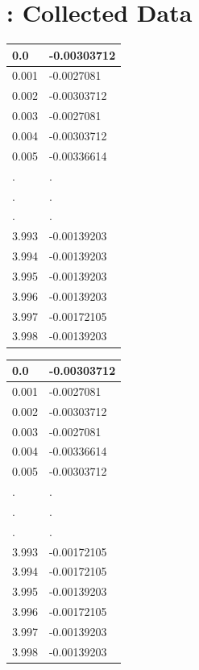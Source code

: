 \documentclass[a4paper, 12pt]{article}
\begin{document}
\section{: Collected Data}
\begin{center}
\begin{tabular}{|l|l|}\hline
0.0&-0.00303712\\ \hline
0.001&-0.0027081\\ \hline
0.002&-0.00303712\\ \hline
0.003&-0.0027081\\ \hline
0.004&-0.00303712\\ \hline
0.005&-0.00336614\\ \hline
.&.\\
.&.\\
.&.\\
3.993&-0.00139203\\ \hline
3.994&-0.00139203\\ \hline
3.995&-0.00139203\\ \hline
3.996&-0.00139203\\ \hline
3.997&-0.00172105\\ \hline
3.998&-0.00139203\\ \hline
	\end{tabular}
\end{center}
\newpage
\begin{center}
\begin{tabular}{|l|l|}\hline
0.0&-0.00303712\\ \hline
0.001&-0.0027081\\ \hline
0.002&-0.00303712\\ \hline
0.003&-0.0027081\\ \hline
0.004&-0.00336614\\ \hline
0.005&-0.00303712\\ \hline
.&.\\
.&.\\
.&.\\
3.993&-0.00172105\\ \hline
3.994&-0.00172105\\ \hline
3.995&-0.00139203\\ \hline
3.996&-0.00172105\\ \hline
3.997&-0.00139203\\ \hline
3.998&-0.00139203\\ \hline
	\end{tabular}
\end{center}
\end{document}
